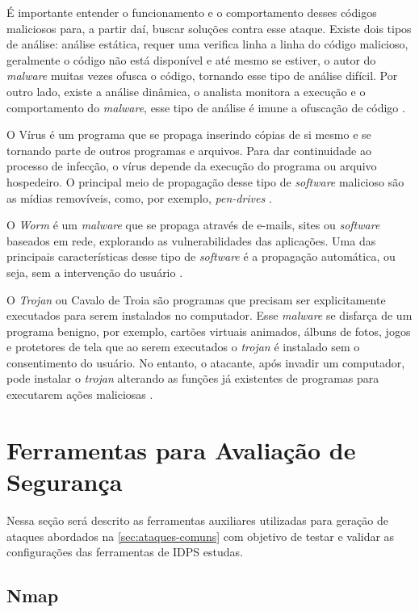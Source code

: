 É importante entender o funcionamento e o comportamento desses códigos maliciosos para, a partir daí, buscar soluções contra esse ataque. Existe dois tipos de análise: análise estática, requer uma verifica linha a linha do código malicioso, geralmente o código não está disponível e até mesmo se estiver, o autor do \textit{malware} muitas vezes ofusca o código, tornando esse tipo de análise difícil. Por outro lado, existe a análise dinâmica, o analista monitora a execução e o comportamento do \textit{malware}, esse tipo de análise é imune a ofuscação de código \cite{encycrypt}.

 O Vírus é um programa que se propaga inserindo cópias de si mesmo e se tornando parte de outros programas e arquivos. Para dar continuidade ao processo de infecção, o vírus depende da execução do programa ou arquivo hospedeiro. O principal meio de propagação desse tipo de \textit{software} malicioso são as mídias removíveis, como, por exemplo, \textit{pen-drives} \cite{certs-malwares}.

 O \textit{Worm} é um \textit{malware} que se propaga através de e-mails, sites ou \textit{software} baseados em rede, explorando as vulnerabilidades das aplicações. Uma das principais características desse tipo de \textit{software} é a propagação automática, ou seja, sem a intervenção do usuário \cite{detectingworm}. 

 O \textit{Trojan} ou Cavalo de Troia são programas que precisam ser explicitamente executados para serem instalados no computador. Esse \textit{malware} se disfarça de um programa benigno, por exemplo, cartões virtuais animados, álbuns de fotos, jogos e protetores de tela que ao serem executados o \textit{trojan} é instalado sem o consentimento do usuário. No entanto, o atacante, após invadir um computador, pode instalar o \textit{trojan} alterando as funções já existentes de programas para executarem ações maliciosas \cite{certs-malwares}.

 \section{Ferramentas para Avaliação de Segurança} \label{sec:ferramentas}

 Nessa seção será descrito as ferramentas auxiliares utilizadas para geração de ataques abordados na \autoref{sec:ataques-comuns} com objetivo de testar e validar as configurações das ferramentas de IDPS estudas. 

 \subsection{Nmap} \label{sec:nmap}

